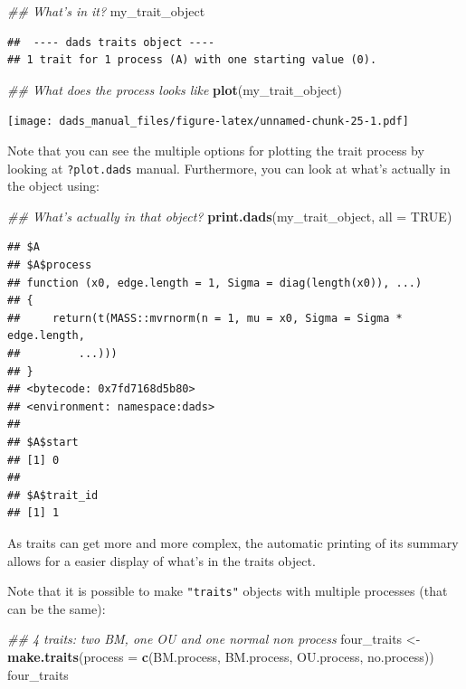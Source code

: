 \documentclass[]{book}
\newenvironment{Shaded}{\begin{snugshade}}{\end{snugshade}}
\newcommand{\CommentTok}[1]{\textcolor[rgb]{0.56,0.35,0.01}{\textit{#1}}}
\newcommand{\DataTypeTok}[1]{\textcolor[rgb]{0.13,0.29,0.53}{#1}}
\newcommand{\KeywordTok}[1]{\textcolor[rgb]{0.13,0.29,0.53}{\textbf{#1}}}
\newcommand{\NormalTok}[1]{#1}
\newcommand{\OtherTok}[1]{\textcolor[rgb]{0.56,0.35,0.01}{#1}}
\newcommand{\StringTok}[1]{\textcolor[rgb]{0.31,0.60,0.02}{#1}}
\begin{document}
\begin{Shaded}
\begin{Highlighting}[]
\CommentTok{## What's in it?}
\NormalTok{my_trait_object}
\end{Highlighting}
\end{Shaded}

\begin{verbatim}
##  ---- dads traits object ---- 
## 1 trait for 1 process (A) with one starting value (0).
\end{verbatim}

\begin{Shaded}
\begin{Highlighting}[]
\CommentTok{## What does the process looks like}
\KeywordTok{plot}\NormalTok{(my_trait_object)}
\end{Highlighting}
\end{Shaded}

\texttt{[image: dads\_manual\_files/figure-latex/unnamed-chunk-25-1.pdf]}

Note that you can see the multiple options for plotting the trait process by looking at \texttt{?plot.dads} manual. Furthermore, you can look at what's actually in the object using:

\begin{Shaded}
\begin{Highlighting}[]
\CommentTok{## What's actually in that object?}
\KeywordTok{print.dads}\NormalTok{(my_trait_object, }\DataTypeTok{all =} \OtherTok{TRUE}\NormalTok{)}
\end{Highlighting}
\end{Shaded}

\begin{verbatim}
## $A
## $A$process
## function (x0, edge.length = 1, Sigma = diag(length(x0)), ...) 
## {
##     return(t(MASS::mvrnorm(n = 1, mu = x0, Sigma = Sigma * edge.length, 
##         ...)))
## }
## <bytecode: 0x7fd7168d5b80>
## <environment: namespace:dads>
## 
## $A$start
## [1] 0
## 
## $A$trait_id
## [1] 1
\end{verbatim}

As traits can get more and more complex, the automatic printing of its summary allows for a easier display of what's in the traits object.

Note that it is possible to make \texttt{"traits"} objects with multiple processes (that can be the same):

\begin{Shaded}
\begin{Highlighting}[]
\CommentTok{## 4 traits: two BM, one OU and one normal non process}
\NormalTok{four_traits <-}\StringTok{ }\KeywordTok{make.traits}\NormalTok{(}\DataTypeTok{process =} \KeywordTok{c}\NormalTok{(BM.process,}
\NormalTok{                                       BM.process,}
\NormalTok{                                       OU.process,}
\NormalTok{                                       no.process))}
\NormalTok{four_traits}
\end{Highlighting}
\end{Shaded}
\end{document}
